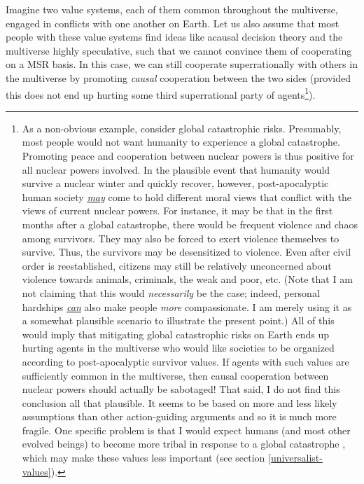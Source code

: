 Imagine two value systems, each of them common throughout the
multiverse, engaged in conflicts with one another on Earth. Let us also
assume that most people with these value systems find ideas like acausal
decision theory and the multiverse highly speculative, such that we
cannot convince them of cooperating on a MSR basis. In this case, we can
still cooperate superrationally with others in the multiverse by
promoting \emph{causal} cooperation between the two sides (provided this
does not end up hurting some third superrational party of
agents\footnote{As a non-obvious example, consider global catastrophic
  risks. Presumably, most people would not want humanity to experience a
  global catastrophe. Promoting peace and cooperation between nuclear
  powers is thus positive for all nuclear powers involved. In the
  plausible event that humanity would survive a nuclear winter and
  quickly recover, however, post-apocalyptic human society
  \href{https://foundational-research.org/how-would-catastrophic-risks-affect-prospects-for-compromise/\#Other_costs_to_catastrophes}{\emph{may}}
  come to hold different moral views that conflict with the views of
  current nuclear powers. For instance, it may be that in the first
  months after a global catastrophe, there would be frequent violence
  and chaos among survivors. They may also be forced to exert violence
  themselves to survive. Thus, the survivors may be desensitized to
  violence. Even after civil order is reestablished, citizens may still
  be relatively unconcerned about violence towards animals, criminals,
  the weak and poor, etc. (Note that I am not claiming that this would
  \emph{necessarily} be the case; indeed, personal hardships
  \href{http://reducing-suffering.org/how-important-is-experiencing-suffering-for-caring-about-suffering/}{\emph{can}}
  also make people \emph{more} compassionate. I am merely using it as a
  somewhat plausible scenario to illustrate the present point.) All of
  this would imply that mitigating global catastrophic risks on Earth
  ends up hurting agents in the multiverse who would like societies to
  be organized according to post-apocalyptic survivor values. If agents
  with such values are sufficiently common in the multiverse, then
  causal cooperation between nuclear powers should actually be
  sabotaged! That said, I do not find this conclusion all that
  plausible. It seems to be based on more and less likely assumptions
  than other action-guiding arguments and so it is much more fragile.
  One specific problem is that I would expect humans (and most other
  evolved beings) to become more tribal in response to a global
  catastrophe \parencite{Henrich2015-xe}, which may make
  these values less important (see section
  \ref{universalist-values}).}).

